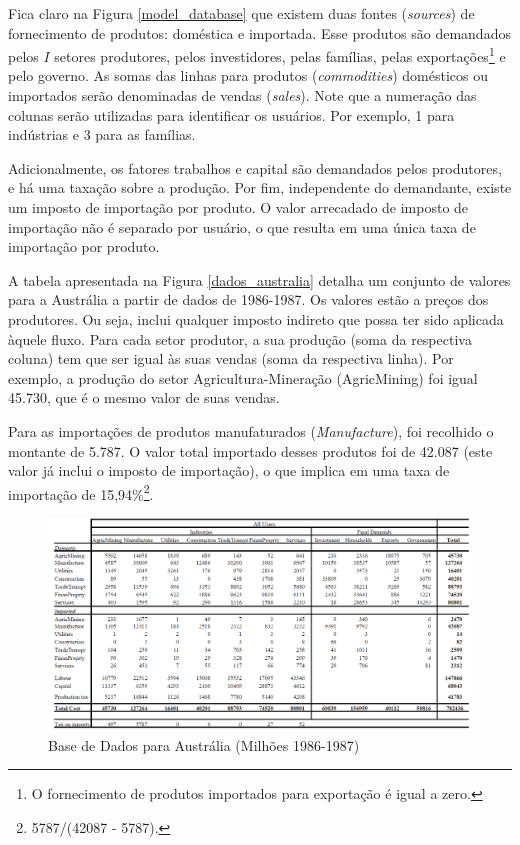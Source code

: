 \documentclass[12pt,twoside]{article}
\let\rmarkdownfootnote\footnote%
\def\footnote{\protect\rmarkdownfootnote}
\begin{document}
Fica claro na Figura \ref{model_database} que existem duas fontes
(\emph{sources}) de fornecimento de produtos: doméstica e importada.
Esse produtos são demandados pelos \(I\) setores produtores, pelos
investidores, pelas famílias, pelas exportações\footnote{O fornecimento
  de produtos importados para exportação é igual a zero.} e pelo
governo. As somas das linhas para produtos (\emph{commodities})
domésticos ou importados serão denominadas de vendas (\emph{sales}).
Note que a numeração das colunas serão utilizadas para identificar os
usuários. Por exemplo, 1 para indústrias e 3 para as famílias.

Adicionalmente, os fatores trabalhos e capital são demandados pelos
produtores, e há uma taxação sobre a produção. Por fim, independente do
demandante, existe um imposto de importação por produto. O valor
arrecadado de imposto de importação não é separado por usuário, o que
resulta em uma única taxa de importação por produto.

A tabela apresentada na Figura \ref{dados_australia} detalha um conjunto
de valores para a Austrália a partir de dados de 1986-1987. Os valores
estão a preços dos produtores. Ou seja, inclui qualquer imposto indireto
que possa ter sido aplicada àquele fluxo. Para cada setor produtor, a
sua produção (soma da respectiva coluna) tem que ser igual às suas
vendas (soma da respectiva linha). Por exemplo, a produção do setor
Agricultura-Mineração (AgricMining) foi igual 45.730, que é o mesmo
valor de suas vendas.

Para as importações de produtos manufaturados (\emph{Manufacture}), foi
recolhido o montante de 5.787. O valor total importado desses produtos
foi de 42.087 (este valor já inclui o imposto de importação), o que
implica em uma taxa de importação de 15,94\%\footnote{5787/(42087 -
  5787).}.

\begin{figure}

{\centering \includegraphics[width=8.83in,angle=90]{minimal_database_australia} 

}

\caption{Base de Dados para Austrália (Milhões 1986-1987)\label{dados_australia}}\label{fig:unnamed-chunk-13}
\end{figure}
\end{document}
